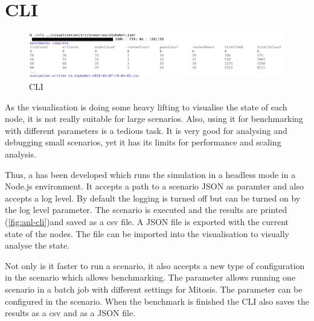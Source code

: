 \section{CLI}

\begin{figure}
\centering
\includegraphics[width=1\textwidth]{graphics/analysis-tools/cli.jpg}
\caption{CLI}
\label{fig:anl-cli}
\end{figure}

As the visualisation is doing some heavy lifting to visualise the state of each node, it is not really suitable for large scenarios. Also, using it for benchmarking with different parameters is a tedious task. It is very good for analysing and debugging small scenarios, yet it has its limits for performance and scaling analysis.

Thus, a  has been developed which runs the simulation in a headless mode in a Node.js environment. It accepts a path to a scenario JSON as paramter and also accepts a log level. By default the logging is turned off but can be turned on by the log level parameter. The scenario is executed and the results are printed (\vref{fig:anl-cli})and saved as a \gls{csv} file. A JSON file is exported with the current state of the nodes. The file can be imported into the visualisation to visually analyse the state.

Not only is it faster to run a scenario, it also accepts a new type of configuration in the scenario which allows benchmarking. The parameter allows running one scenario in a batch job with different settings for Mitosis. The parameter can be configured in the scenario. When the benchmark is finished the CLI also saves the results as a \gls{csv} and as a JSON file.
